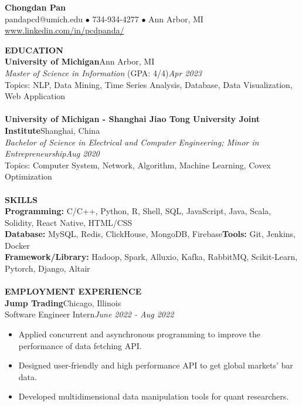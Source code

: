 \documentclass[10pt,a4paper]{article}
\begin{document}
\begin{center}
    \Large{\textbf{Chongdan Pan}}\\
    \normalsize{pandapcd@umich.edu $\bullet$ 734-934-4277 $\bullet$ Ann Arbor, MI}\\
    \normalsize{\href{https://www.linkedin.com/in/pcdpanda/}{www.linkedin.com/in/pcdpanda/}}
\end{center}
\noindent
\rlap{\rule[-1mm]{\linewidth}{.5mm}}\textbf{\large{EDUCATION}}\\
\noindent\textbf{University of Michigan}\hfill Ann Arbor, MI\\
\emph{Master of Science in Information} (GPA: 4/4)\hfill\emph{Apr 2023}\\
Topics: NLP, Data Mining, Time Series Analysis, Database, Data Visualization, Web Application\\\\
\textbf{University of Michigan - Shanghai Jiao Tong University Joint Institute}\hfill Shanghai, China\\
\emph{Bachelor of Science in Electrical and Computer Engineering; Minor in Entrepreneurship}\hfill\emph{Aug 2020}\\
Topics: Computer System, Network, Algorithm, Machine Learning, Covex Optimization\\\\
\noindent
\rlap{\rule[-1mm]{\linewidth}{.5mm}}\textbf{\large{SKILLS}}\\
\textbf{Programming: }C/C++, Python, R, Shell, SQL, JavaScript, Java, Scala, Solidity, React Native, HTML/CSS\\
\textbf{Database: }MySQL, Redis, ClickHouse, MongoDB, Firebase\qquad\textbf{Tools: }Git, Jenkins, Docker\\
\textbf{Framework/Library: }Hadoop, Spark, Alluxio, Kafka, RabbitMQ, Scikit-Learn, Pytorch, Django, Altair\\\\
\noindent
\rlap{\rule[-1mm]{\linewidth}{.5mm}}\textbf{\large{EMPLOYMENT EXPERIENCE}}\\
\textbf{Jump Trading}\hfill Chicago, Illinois\\
Software Engineer Intern\hfill\emph{June 2022 - Aug 2022}
\begin{itemize}[noitemsep,topsep=0pt]
    \item Applied concurrent and asynchronous programming to improve the performance of data fetching API.
    \item Designed user-friendly and high performance API to get global markets' bar data. 
    \item Developed multidimensional data manipulation tools for quant researchers.
\end{itemize}
\end{document}

